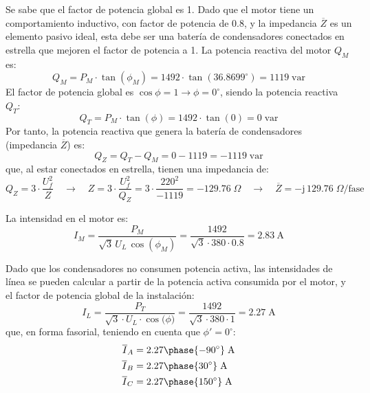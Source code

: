 Se sabe que el factor de potencia global es 1. Dado que el motor tiene
un comportamiento inductivo, con factor de potencia de $0.8$, y la
impedancia $\overline{Z}$ es un elemento pasivo ideal, {esta debe ser
  una batería de condensadores} conectados en estrella que mejoren el
factor de potencia a 1. La potencia reactiva del motor $Q_M$ es:
\begin{equation*}
  Q_M=P_M\cdot \tan(\phi_M)=1492\cdot \tan(36.8699^\circ)=1119\;\text{var}
\end{equation*}
El factor de potencia global es $\cos{\phi}=1\rightarrow\phi=0^\circ$,
siendo la potencia reactiva $Q_T$:
\begin{equation*}
  Q_T=P_M\cdot \tan(\phi)=1492\cdot \tan(0)=0\;\text{var}
\end{equation*}
Por tanto, la potencia reactiva que genera la batería de condensadores
(impedancia $\overline{Z}$) es:
\begin{equation*}
  Q_Z=Q_T-Q_M=0-1119=-1119\;\text{var}
\end{equation*}
que, al estar conectados en estrella, tienen una impedancia de:
\begin{equation*}
  Q_Z=3\cdot \dfrac{U_f^2}{Z} \quad\rightarrow\quad Z=3\cdot \dfrac{U_f^2}{Q_Z}=3\cdot \dfrac{220^2}{-1119}=-129.76\;\Omega \quad\rightarrow\quad \overline{Z}={-\mathrm{j}\,129.76}\;\Omega\text{/fase}
\end{equation*}

La intensidad en el motor es:
\begin{equation*}
  I_M=\dfrac{P_M}{\sqrt{3}\,U_L\,\cos(\phi_M)}=\dfrac{1492}{\sqrt{3}\cdot 380\cdot 0.8}= \qty{2.83}{\ampere}
\end{equation*}

Dado que los condensadores no consumen potencia activa, las
intensidades de línea se pueden calcular a partir de la potencia
activa consumida por el motor, y el factor de potencia global de la
instalación:
\begin{equation*}
  I_L=\dfrac{P_T}{\sqrt{3}\cdot U_L\cdot \cos{(\phi})}=\dfrac{1492}{\sqrt{3}\cdot 380\cdot 1}=2.27\;\text{A}
\end{equation*}
que, en forma fasorial, teniendo en cuenta que $\phi'=0^\circ$:
\begin{align*}
  \overline{I}_{A}&={2.27\phase{-90^\circ}\;\text{A}}\\
  \overline{I}_{B}&={2.27\phase{30^\circ}\;\text{A}}\\
  \overline{I}_{C}&={2.27\phase{150^\circ}\;\text{A}}
\end{align*}

